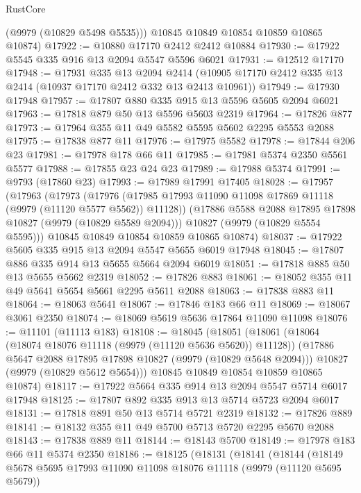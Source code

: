 \begin{lexlean}{RustCore}
\begin{coremodule}
        (@9979 (@10829 @5498 @5535)))
      @10845
      @10849
      @10854
      @10859
      @10865
      @10874)
@17922 := @10880 @17170 @2412 @2412 @10884
@17930 := @17922 @5545 @335 @916 @13 @2094 @5547 @5596 @6021
@17931 := @12512 @17170
@17948 := @17931
    @335
    @13
    @2094
    @2414
    (@10905 @17170 @2412 @335 @13 @2414 (@10937 @17170 @2412 @332 @13 @2413 @10961))
@17949 := @17930 @17948
@17957 := @17807 @880 @335 @915 @13 @5596 @5605 @2094 @6021
@17963 := @17818 @879 @50 @13 @5596 @5603 @2319
@17964 := @17826 @877
@17973 := @17964 @355 @11 @49 @5582 @5595 @5602 @2295 @5553 @2088
@17975 := @17838 @877 @11
@17976 := @17975 @5582
@17978 := @17844 @206 @23
@17981 := @17978 @178 @66 @11
@17985 := @17981 @5374 @2350 @5561 @5577
@17988 := @17855 @23 @24 @23
@17989 := @17988 @5374
@17991 := @9793 (@17860 @23)
@17993 := @17989 @17991 @17405
@18028 := @17957
    (@17963
      (@17973
        (@17976 (@17985 @17993 @11090 @11098 @17869 @11118 (@9979 (@11120 @5577 @5562)) @11128))
        (@17886 @5588 @2088 @17895 @17898 @10827 (@9979 (@10829 @5589 @2094)))
        @10827
        (@9979 (@10829 @5554 @5595)))
      @10845
      @10849
      @10854
      @10859
      @10865
      @10874)
@18037 := @17922 @5605 @335 @915 @13 @2094 @5547 @5655 @6019 @17948
@18045 := @17807 @886 @335 @914 @13 @5655 @5664 @2094 @6019
@18051 := @17818 @885 @50 @13 @5655 @5662 @2319
@18052 := @17826 @883
@18061 := @18052 @355 @11 @49 @5641 @5654 @5661 @2295 @5611 @2088
@18063 := @17838 @883 @11
@18064 := @18063 @5641
@18067 := @17846 @183 @66 @11
@18069 := @18067 @3061 @2350
@18074 := @18069 @5619 @5636 @17864 @11090 @11098
@18076 := @11101 (@11113 @183)
@18108 := @18045
    (@18051
      (@18061
        (@18064 (@18074 @18076 @11118 (@9979 (@11120 @5636 @5620)) @11128))
        (@17886 @5647 @2088 @17895 @17898 @10827 (@9979 (@10829 @5648 @2094)))
        @10827
        (@9979 (@10829 @5612 @5654)))
      @10845
      @10849
      @10854
      @10859
      @10865
      @10874)
@18117 := @17922 @5664 @335 @914 @13 @2094 @5547 @5714 @6017 @17948
@18125 := @17807 @892 @335 @913 @13 @5714 @5723 @2094 @6017
@18131 := @17818 @891 @50 @13 @5714 @5721 @2319
@18132 := @17826 @889
@18141 := @18132 @355 @11 @49 @5700 @5713 @5720 @2295 @5670 @2088
@18143 := @17838 @889 @11
@18144 := @18143 @5700
@18149 := @17978 @183 @66 @11 @5374 @2350
@18186 := @18125
    (@18131
      (@18141
        (@18144
          (@18149
            @5678
            @5695
            @17993
            @11090
            @11098
            @18076
            @11118
            (@9979 (@11120 @5695 @5679))

\end{coremodule}
\end{lexlean}
